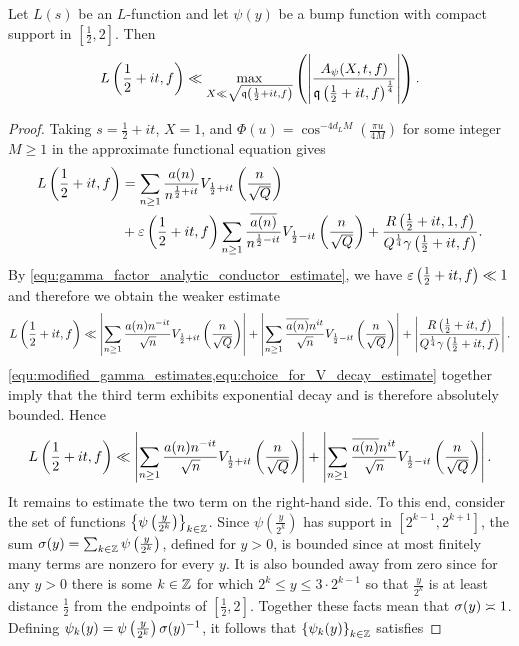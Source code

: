 \documentclass[12pt]{article}
\begin{document}
    \begin{theorem}\label{thm:critical_line_estimate}
      Let \(L(s)\) be an \(L\)-function and let \(\psi(y)\) be a bump function with compact support in \(\left[\frac{1}{2},2\right]\). Then
      \[
        L\left(\frac{1}{2}+it,f\right) \ll \max_{X \ll \sqrt{\mathfrak{q}\left(\frac{1}{2}+it,f\right)}}\left(\left|\frac{A_{\psi}(X,t,f)}{\mathfrak{q}\left(\frac{1}{2}+it,f\right)^{\frac{1}{4}}}\right|\right).
      \]
    \end{theorem}
    \begin{proof}
      Taking \(s = \frac{1}{2}+it\), \(X = 1\), and \(\Phi(u) = \cos^{-4d_{L}M}\left(\frac{\pi u}{4M}\right)\) for some integer \(M \ge 1\) in the approximate functional equation gives
      \begin{align*}
        L\left(\frac{1}{2}+it,f\right) &= \sum_{n \ge 1}\frac{a(n)}{n^{\frac{1}{2}+it}}V_{\frac{1}{2}+it}\left(\frac{n}{\sqrt{Q}}\right) \\
        &+ \varepsilon\left(\frac{1}{2}+it,f\right)\sum_{n \ge 1}\frac{\overline{a(n)}}{n^{\frac{1}{2}-it}}V_{\frac{1}{2}-it}\left(\frac{n}{\sqrt{Q}}\right)+\frac{R\left(\frac{1}{2}+it,1,f\right)}{Q^{\frac{1}{4}}\gamma\left(\frac{1}{2}+it,f\right)}.
      \end{align*}
      By \cref{equ:gamma_factor_analytic_conductor_estimate}, we have \(\varepsilon\left(\frac{1}{2}+it,f\right) \ll 1\) and therefore we obtain the weaker estimate
      \[
        L\left(\frac{1}{2}+it,f\right) \ll \left|\sum_{n \ge 1}\frac{a(n)n^{-it}}{\sqrt{n}}V_{\frac{1}{2}+it}\left(\frac{n}{\sqrt{Q}}\right)\right|+\left|\sum_{n \ge 1}\frac{\overline{a(n)}n^{it}}{\sqrt{n}}V_{\frac{1}{2}-it}\left(\frac{n}{\sqrt{Q}}\right)\right|+\left|\frac{R\left(\frac{1}{2}+it,f\right)}{Q^{\frac{1}{4}}\gamma\left(\frac{1}{2}+it,f\right)}\right|.
      \]
      \cref{equ:modified_gamma_estimates,equ:choice_for_V_decay_estimate} together imply that the third term exhibits exponential decay and is therefore absolutely bounded. Hence
      \[
        L\left(\frac{1}{2}+it,f\right) \ll \left|\sum_{n \ge 1}\frac{a(n)n^{-it}}{\sqrt{n}}V_{\frac{1}{2}+it}\left(\frac{n}{\sqrt{Q}}\right)\right|+\left|\sum_{n \ge 1}\frac{\overline{a(n)}n^{it}}{\sqrt{n}}V_{\frac{1}{2}-it}\left(\frac{n}{\sqrt{Q}}\right)\right|.
      \]
      It remains to estimate the two term on the right-hand side. To this end, consider the set of functions \(\left\{\psi\left(\frac{y}{2^{k}}\right)\right\}_{k \in \mathbb{Z}}\). Since \(\psi\left(\frac{y}{2^{k}}\right)\) has support in \([2^{k-1},2^{k+1}]\), the sum \(\sigma(y) = \sum_{k \in \mathbb{Z}}\psi\left(\frac{y}{2^{k}}\right)\), defined for \(y > 0\), is bounded since at most finitely many terms are nonzero for every \(y\). It is also bounded away from zero since for any \(y > 0\) there is some \(k \in \mathbb{Z}\) for which \(2^{k} \le y \le 3 \cdot 2^{k-1}\) so that \(\frac{y}{2^{k}}\) is at least distance \(\frac{1}{2}\) from the endpoints of \(\left[\frac{1}{2},2\right]\). Together these facts mean that \(\sigma(y) \asymp 1\). Defining \(\psi_{k}(y) = \psi\left(\frac{y}{2^{k}}\right)\sigma(y)^{-1}\), it follows that \(\left\{\psi_{k}(y)\right\}_{k \in \mathbb{Z}}\) satisfies

\end{proof}
\end{document}
